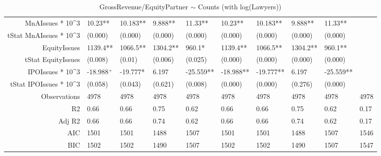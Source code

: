 \begin{table}[ht]
\begin{tabular}{rlllllllll}
  MnAIssues * 10^3 & 10.23** & 10.183** & 9.888** & 11.33** & 10.23** & 10.183** & 9.888** & 11.33** &  \\ 
  tStat MnAIssues * 10^3 & (0.000) & (0.000) & (0.000) & (0.000) & (0.000) & (0.000) & (0.000) & (0.000) &  \\ 
  EquityIssues & 1139.4** & 1066.5** & 1304.2** & 960.1* & 1139.4** & 1066.5** & 1304.2** & 960.1** &  \\ 
  tStat EquityIssues & (0.008) & (0.01) & (0.006) & (0.025) & (0.000) & (0.000) & (0.000) & (0.000) &  \\ 
  IPOIssues * 10^3 & -18.988$^{+}$ & -19.777* & 6.197 & -25.559** & -18.988** & -19.777** & 6.197 & -25.559** &  \\ 
  tStat IPOIssues * 10^3 & (0.058) & (0.043) & (0.621) & (0.008) & (0.000) & (0.000) & (0.276) & (0.000) &  \\ 
  Observations & 4978 & 4978 & 4978 & 4978 & 4978 & 4978 & 4978 & 4978 & 4978 \\ 
  R2 & 0.66 & 0.66 & 0.75 & 0.62 & 0.66 & 0.66 & 0.75 & 0.62 & 0.17 \\ 
  Adj R2 & 0.66 & 0.66 & 0.74 & 0.62 & 0.66 & 0.66 & 0.74 & 0.62 & 0.17 \\ 
  AIC & 1501 & 1501 & 1488 & 1507 & 1501 & 1501 & 1488 & 1507 & 1546 \\ 
  BIC & 1502 & 1502 & 1490 & 1507 & 1502 & 1502 & 1490 & 1507 & 1547 \\ 
   \hline
\end{tabular}
\caption{GrossRevenue/EquityPartner $\sim$ Counts (with log(Lawyers))} 
\end{table}

